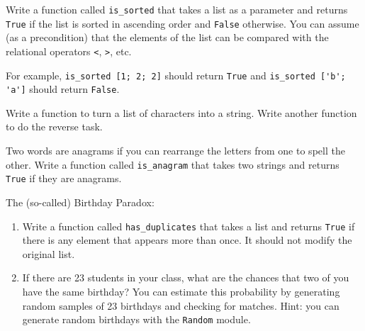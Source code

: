 \documentclass[10pt]{book}
\begin{document}
{\begin{ex}
Write a function called \verb"is_sorted" that takes a list as a
parameter and returns {\tt True} if the list is sorted in ascending
order and {\tt False} otherwise.  You can assume (as a precondition)
that the elements of the list can be compared with the relational
operators {\tt <}, {\tt >}, etc.


For example, \verb"is_sorted [1; 2; 2]" should return {\tt True}
and \verb"is_sorted ['b'; 'a']" should return {\tt False}.
\end{ex}

\begin{ex}
Write a function to turn a list of characters into a string. Write
another function to do the reverse task.
\end{ex}

\begin{ex}
\label{anagram}


Two words are anagrams if you can rearrange the letters from one
to spell the other.  Write a function called \verb"is_anagram"
that takes two strings and returns {\tt True} if they are anagrams.
\end{ex}


\begin{ex}
\label{duplicate}

The (so-called) Birthday Paradox:

\begin{enumerate}


\item Write a function called \verb"has_duplicates" that takes
a list and returns {\tt True} if there is any element that
appears more than once.  It should not modify the original
list.

\item If there are 23 students in your class, what are the chances
that two of you have the same birthday?  You can estimate this
probability by generating random samples of 23 birthdays
and checking for matches.
Hint: you can generate random birthdays with the {\tt Random} module.


\end{enumerate}


\end{ex}}
\end{document}

